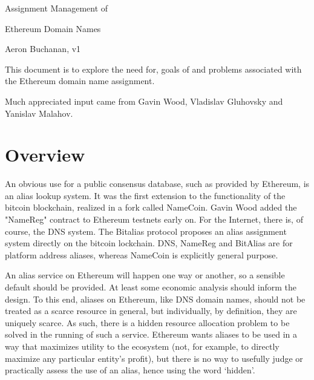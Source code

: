 \documentclass[10pt,a4paper]{article}
\begin{document}
\def\ether{Ether\xspace}
\def\ie{{i.e.}\xspace}
\def\eg{{e.g.}\xspace}
\def\tld{{\sc tld}}
\def\tlds{{\sc tld}s\xspace}
\def\slds{{\sc sld}s\xspace}
\def\icann{{\sc icann}\xspace}
\def\qrcode{{\sc qr}-code\xspace}
\def\qrcodes{{\sc qr}-codes\xspace}
\def\nfc{{\sc nfc}\xspace}
\def\dapp{{\sc da}pp\xspace}
\def\dapps{{\sc da}pps\xspace}

\begin{center}
{\huge Assignment Management of 

Ethereum Domain Names}

{\small Aeron Buchanan, v1}
\end{center}

This document is to explore the need for, goals of and problems associated with the Ethereum domain name assignment.

Much appreciated input came from Gavin Wood, Vladislav Gluhovsky and Yanislav Malahov.

\section*{Overview}

An obvious use for a public consensus database, such as provided by Ethereum, is an alias lookup system. It was the first extension to the functionality of the bitcoin blockchain, realized in a fork called NameCoin. Gavin Wood added the "NameReg" contract to Ethereum testnets early on. For the Internet, there is, of course, the DNS system. The Bitalias protocol proposes an alias assignment system directly on the bitcoin lockchain. DNS, NameReg and BitAlias are for platform address aliases, whereas NameCoin is explicitly general purpose. 

An alias service on Ethereum will happen one way or another, so a sensible default should be provided. At least some economic analysis should inform the design. To this end, aliases on Ethereum, like DNS domain names, should not be treated as a scarce resource in general, but individually, by definition, they are uniquely scarce. As such, there is a hidden resource allocation problem to be solved in the running of such a service. Ethereum wants aliases to be used in a way that maximizes utility to the ecosystem (not, for example, to directly maximize any particular entity's profit), but there is no way to usefully judge or practically assess the use of an alias, hence using the word `hidden'. 
\end{document}

